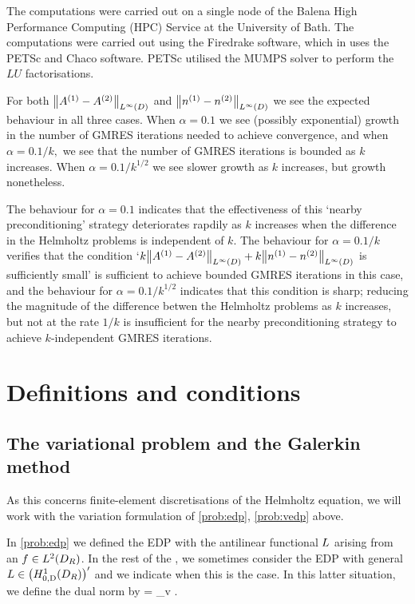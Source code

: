   The computations were carried out on a single node of the Balena High Performance Computing (HPC) Service at the University of Bath. The computations were carried out using the Firedrake software, which in uses the PETSc and Chaco software. PETSc utilised the MUMPS solver to perform the $LU$ factorisations.

  For both $\NLiD{\Aso-\Ast}$ and $\NLiD{\nso-\nst}$ we see the expected behaviour in all three cases. When $\alpha = 0.1$ we see (possibly exponential) growth in the number of GMRES iterations needed to achieve convergence, and when $\alpha = 0.1/k,$ we see that the number of GMRES iterations is bounded as $k$ increases. When $\alpha = 0.1/k^{1/2}$ we see slower growth as $k$ increases, but growth nonetheless.

  The behaviour for $\alpha = 0.1$ indicates that the effectiveness of this `nearby preconditioning' strategy deteriorates rapdily as $k$ increases when the difference in the Helmholtz problems is independent of $k$. The behaviour for $\alpha = 0.1/k$ verifies that the condition `$k\NLiD{\Aso-\Ast} + k\NLiD{\nso-\nst}$ is sufficiently small' is sufficient to achieve bounded GMRES iterations in this case, and the behaviour for $\alpha = 0.1/k^{1/2}$ indicates that this condition is sharp; reducing the magnitude of the difference betwen the Helmholtz problems as $k$ increases, but not at the rate $1/k$ is insufficient for the nearby preconditioning strategy to achieve $k$-independent GMRES iterations.



\section{Definitions and conditions}\label{sec:3}

\subsection{The variational problem and the Galerkin method}\label{sec:vpGm}
As this  concerns finite-element discretisations of the Helmholtz equation, we will work with the variation formulation of \cref{prob:edp}, \cref{prob:vedp} above.

In \cref{prob:edp} we defined the EDP with the antilinear functional $L$ arising from an $f\in \LtDR$. In the rest of the , 
we sometimes consider the EDP with general $\LE\in \HozDDRp$ and we indicate when this is the case.
In this latter situation, we define the dual norm by
\beq\label{eq:dualnorm}
= \sup_{v\in \HozDDR} .
\eeq
\ere


